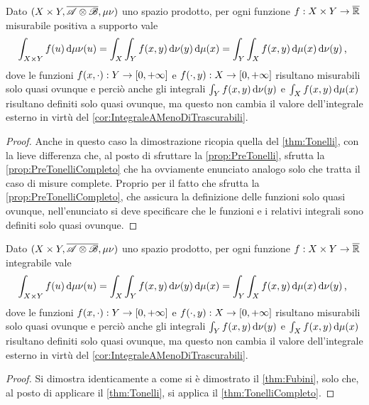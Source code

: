 \begin{theorem}[Tonelli]\label{thm:TonelliCompleto}
	Dato $(X\times Y,\overline{\mathscr A\otimes\mathscr B},\mu\nu)$ uno spazio prodotto, per ogni funzione $f:X\times Y\to\overline{\mathbb R}$ misurabile positiva a supporto \sigfin[o] vale
	\begin{equation*}
		\int_{X\times Y}f(u)\,\mathrm d\mu\nu(u)=\int_X\int_Y f(x,y)\,\mathrm d\nu(y)\,\mathrm d\mu(x)=\int_Y\int_X f(x,y)\,\mathrm d\mu(x)\,\mathrm d\nu(y)\, \text{, }
	\end{equation*}
	dove le funzioni $f(x,\cdot):Y\to[0,+\infty]$ e $f(\cdot,y):X\to[0,+\infty]$ risultano misurabili solo quasi ovunque e perciò anche gli integrali $\int_Y f(x,y)\,\mathrm d\nu(y)$ e $\int_X f(x,y)\,\mathrm d\mu(x)$ risultano definiti solo quasi ovunque, ma questo non cambia il valore dell'integrale esterno in virtù del \cref{cor:IntegraleAMenoDiTrascurabili}.
\end{theorem}
\begin{proof}
	Anche in questo caso la dimostrazione ricopia quella del \cref{thm:Tonelli}, con la lieve differenza che, al posto di sfruttare la \cref{prop:PreTonelli}, sfrutta la \cref{prop:PreTonelliCompleto} che ha ovviamente enunciato analogo solo che tratta il caso di misure complete. 
	Proprio per il fatto che sfrutta la \cref{prop:PreTonelliCompleto}, che assicura la definizione delle funzioni solo quasi ovunque, nell'enunciato si deve specificare che le funzioni e i relativi integrali sono definiti solo quasi ovunque.
\end{proof}

\begin{theorem}[Fubini]\label{thm:FubiniCompleto}
	Dato $(X\times Y,\overline{\mathscr A\otimes\mathscr B},\mu\nu)$ uno spazio prodotto, per ogni funzione $f:X\times Y\to\overline{\mathbb R}$ integrabile vale
	\begin{equation*}
		\int_{X\times Y}f(u)\,\mathrm d\mu\nu(u)=\int_X\int_Y f(x,y)\,\mathrm d\nu(y)\,\mathrm d\mu(x)=\int_Y\int_X f(x,y)\,\mathrm d\mu(x)\,\mathrm d\nu(y)\, \text{, }
	\end{equation*}
	dove le funzioni $f(x,\cdot):Y\to[0,+\infty]$ e $f(\cdot,y):X\to[0,+\infty]$ risultano misurabili solo quasi ovunque e perciò anche gli integrali $\int_Y f(x,y)\,\mathrm d\nu(y)$ e $\int_X f(x,y)\,\mathrm d\mu(x)$ risultano definiti solo quasi ovunque, ma questo non cambia il valore dell'integrale esterno in virtù del \cref{cor:IntegraleAMenoDiTrascurabili}.
\end{theorem}
\begin{proof}
	Si dimostra identicamente a come si è dimostrato il \cref{thm:Fubini}, solo che, al posto di applicare il \cref{thm:Tonelli}, si applica il \cref{thm:TonelliCompleto}.
\end{proof}

